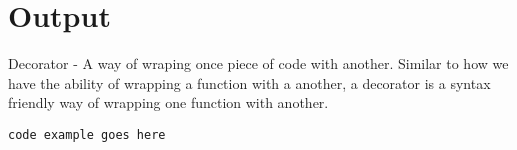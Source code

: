 \maketitle{}
\section{ Output }

Decorator - A way of wraping once piece of code with another. Similar to how
we have the ability of wrapping a function with a another, a decorator is a
syntax friendly way of wrapping one function with another.
\begin{lstlisting}
code example goes here
\end{lstlisting}
